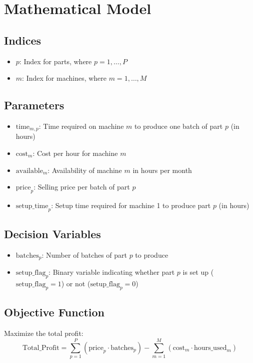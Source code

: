 \documentclass{article}
\begin{document}
\section*{Mathematical Model}

\subsection*{Indices}
\begin{itemize}
    \item \( p \): Index for parts, where \( p = 1, \ldots, P \)
    \item \( m \): Index for machines, where \( m = 1, \ldots, M \)
\end{itemize}

\subsection*{Parameters}
\begin{itemize}
    \item \( \text{time}_{m,p} \): Time required on machine \( m \) to produce one batch of part \( p \) (in hours)
    \item \( \text{cost}_{m} \): Cost per hour for machine \( m \)
    \item \( \text{available}_{m} \): Availability of machine \( m \) in hours per month
    \item \( \text{price}_{p} \): Selling price per batch of part \( p \)
    \item \( \text{setup\_time}_{p} \): Setup time required for machine 1 to produce part \( p \) (in hours)
\end{itemize}

\subsection*{Decision Variables}
\begin{itemize}
    \item \( \text{batches}_{p} \): Number of batches of part \( p \) to produce
    \item \( \text{setup\_flag}_{p} \): Binary variable indicating whether part \( p \) is set up (\( \text{setup\_flag}_{p} = 1 \)) or not (\( \text{setup\_flag}_{p} = 0 \))
\end{itemize}

\subsection*{Objective Function}
Maximize the total profit:
\[
\text{Total\_Profit} = \sum_{p=1}^{P} \left( \text{price}_{p} \cdot \text{batches}_{p} \right) - \sum_{m=1}^{M} \left( \text{cost}_{m} \cdot \text{hours\_used}_{m} \right)
\]
\end{document}
